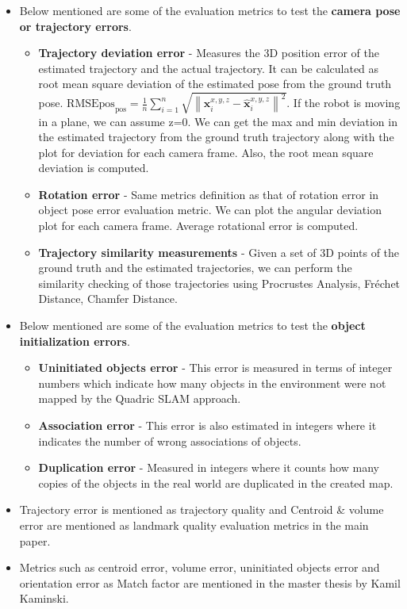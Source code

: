 \documentclass[report.tex]{subfiles}
\begin{document}
\begin{itemize}
\item Below mentioned are some of the evaluation metrics to test the \textbf{camera pose or trajectory errors}.
\begin{itemize}
    \item \textbf{Trajectory deviation error} - Measures the 3D position error of the estimated trajectory and the actual trajectory. It can be calculated as root mean square deviation of the estimated pose from the ground truth pose. $\mathrm{RMSE} \mathrm{pos}_{\mathrm{pos}}=\frac{1}{n} \sum_{i=1}^{n} \sqrt{\left\|\mathbf{x}_{i}^{x, y, z}-\hat{\mathbf{x}}_{i}^{x, y, z}\right\|^{2}}$. If the robot is moving in a plane, we can assume z=0\cite{sünderhauf2017dual}. We can get the max and min deviation in the estimated trajectory from the ground truth trajectory along with the plot for deviation for each camera frame. Also, the root mean square deviation is computed.
    \item \textbf{Rotation error} - Same metrics definition as that of rotation error in object pose error evaluation metric. We can plot the angular deviation plot for each camera frame. Average rotational error is computed.
    \item \textbf{Trajectory similarity measurements} - Given a set of 3D points of the ground truth and the estimated trajectories, we can perform the similarity checking of those trajectories using Procrustes Analysis, Fréchet Distance, Chamfer Distance.
\end{itemize}

\item Below mentioned are some of the evaluation metrics to test the \textbf{object initialization errors}.
\begin{itemize}
    \item \textbf{Uninitiated objects error} - This error is measured in terms of integer numbers which indicate how many objects in the environment were not mapped by the Quadric SLAM approach.
    \item \textbf{Association error} - This error is also estimated in integers where it indicates the number of wrong associations of objects.
    \item \textbf{Duplication error} - Measured in integers where it counts how many copies of the objects in the real world are duplicated in the created map.
\end{itemize}

\item Trajectory error is mentioned as trajectory quality and Centroid \& volume error are mentioned as landmark quality evaluation metrics in the main paper\cite{sünderhauf2017dual}.
\item Metrics such as centroid error, volume error, uninitiated objects error and orientation error as Match factor are mentioned in the master thesis by Kamil Kaminski\cite{dataassosciation}.



\end{itemize}
\end{document}
